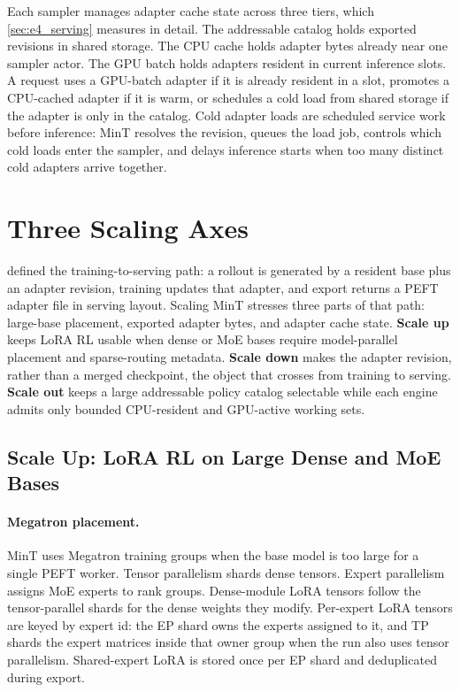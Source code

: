 \documentclass{llmxive}
\begin{document}
Each sampler manages adapter cache state across three tiers, which \cref{sec:e4_serving} measures in detail. The addressable catalog holds exported revisions in shared storage. The CPU cache holds adapter bytes already near one sampler actor. The GPU batch holds adapters resident in current inference slots. A request uses a GPU-batch adapter if it is already resident in a slot, promotes a CPU-cached adapter if it is warm, or schedules a cold load from shared storage if the adapter is only in the catalog. Cold adapter loads are scheduled service work before inference: MinT resolves the revision, queues the load job, controls which cold loads enter the sampler, and delays inference starts when too many distinct cold adapters arrive together.

\section{Three Scaling Axes}
\label{sec:scaling}

 defined the training-to-serving path: a rollout is generated by a resident base plus an adapter revision, training updates that adapter, and export returns a PEFT adapter file in serving layout. Scaling MinT stresses three parts of that path: large-base placement, exported adapter bytes, and adapter cache state. \textbf{Scale up} keeps LoRA RL usable when dense or MoE bases require model-parallel placement and sparse-routing metadata. \textbf{Scale down} makes the adapter revision, rather than a merged checkpoint, the object that crosses from training to serving. \textbf{Scale out} keeps a large addressable policy catalog selectable while each engine admits only bounded CPU-resident and GPU-active working sets.

\subsection{Scale Up: LoRA RL on Large Dense and MoE Bases}

\paragraph{Megatron placement.}
MinT uses Megatron training groups when the base model is too large for a single PEFT worker. Tensor parallelism shards dense tensors. Expert parallelism assigns MoE experts to rank groups. Dense-module LoRA tensors follow the tensor-parallel shards for the dense weights they modify. Per-expert LoRA tensors are keyed by expert id: the EP shard owns the experts assigned to it, and TP shards the expert matrices inside that owner group when the run also uses tensor parallelism. Shared-expert LoRA is stored once per EP shard and deduplicated during export.
\end{document}
